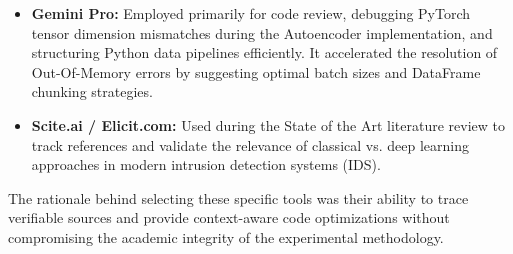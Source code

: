 \begin{itemize}
    \item \textbf{Gemini Pro:} Employed primarily for code review, debugging PyTorch tensor dimension mismatches during the Autoencoder implementation, and structuring Python data pipelines efficiently. It accelerated the resolution of Out-Of-Memory errors by suggesting optimal batch sizes and DataFrame chunking strategies.
    \item \textbf{Scite.ai / Elicit.com:} Used during the State of the Art literature review to track references and validate the relevance of classical vs. deep learning approaches in modern intrusion detection systems (IDS).
\end{itemize}
The rationale behind selecting these specific tools was their ability to trace verifiable sources and provide context-aware code optimizations without compromising the academic integrity of the experimental methodology.
